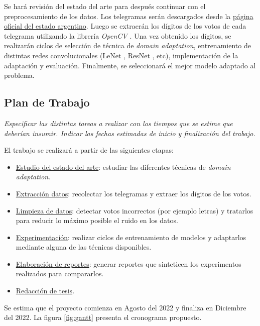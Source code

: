 \documentclass[a4paper, twoside]{report}
\begin{document}
Se har\'a revisi\'on del estado del arte para despu\'es continuar con el preprocesamiento de los datos. Los telegramas ser\'an descargados desde la
\href{https://op.elecciones.gob.ar/telegramas/generales2021/}{p\'agina oficial del estado argentino}. Luego se extraer\'an los d\'igitos de los votos de cada
telegrama utilizando la librer\'ia {\it OpenCV} \cite{opencv_library}. Una vez obtenido los d\'igitos, se realizar\'an ciclos de selecci\'on de t\'ecnica de
	{\it domain adaptation}, entrenamiento de distintas redes convolucionales (LeNet \cite{lecun1998gradient}, ResNet \cite{he2016deep}, etc), implementaci\'on de
la adaptaci\'on y evaluaci\'on. Finalmente, se seleccionar\'a el mejor modelo adaptado al problema.

\subsection*{Plan de Trabajo}
{\it Especificar las distintas tareas a realizar con los tiempos que se
	estime que deberían insumir.
	Indicar las fechas estimadas de inicio y finalización del trabajo.
}

El trabajo se realizar\'a a partir de las siguientes etapas:
\begin{itemize}
	\item \underline{Estudio del estado del arte}: estudiar las diferentes t\'ecnicas
	      de {\it domain adaptation}.
	\item \underline{Extracci\'on datos}: recolectar los telegramas
	      y extraer los d\'igitos de los votos.
	\item \underline{Limpieza de datos}: detectar votos incorrectos (por ejemplo
	      letras) y tratarlos para reducir lo m\'aximo posible el ruido
	      en los datos.
	\item \underline{Experimentaci\'on}: realizar ciclos de entrenamiento de modelos
	      y adaptarlos mediante alguna de las t\'ecnicas disponibles.
	\item \underline{Elaboraci\'on de reportes}: generar reportes que sinteticen los
	      experimentos realizados para compararlos.
	\item \underline{Redacci\'on de tesis}.
\end{itemize}

Se estima que el proyecto comienza en Agosto del 2022 y finaliza en Diciembre del 2022. La figura \ref{fig:gantt} presenta el cronograma propuesto.
\end{document}
